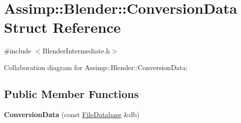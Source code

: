 \hypertarget{struct_assimp_1_1_blender_1_1_conversion_data}{\section{Assimp\+:\+:Blender\+:\+:Conversion\+Data Struct Reference}
\label{struct_assimp_1_1_blender_1_1_conversion_data}
}


{\ttfamily \#include $<$Blender\+Intermediate.\+h$>$}



Collaboration diagram for Assimp\+:\+:Blender\+:\+:Conversion\+Data\+:
\subsection*{Public Member Functions}
\begin{DoxyCompactItemize}
\item 
\hypertarget{struct_assimp_1_1_blender_1_1_conversion_data_a4907727121f6bbf9abe202bdd0bea98d}{{\bfseries Conversion\+Data} (const \hyperlink{class_assimp_1_1_blender_1_1_file_database}{File\+Database} \&db)}\label{struct_assimp_1_1_blender_1_1_conversion_data_a4907727121f6bbf9abe202bdd0bea98d}

\end{DoxyCompactItemize}
